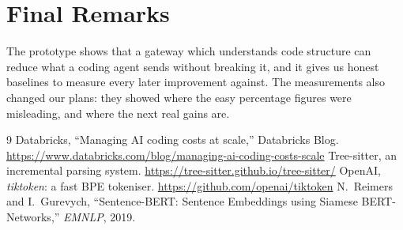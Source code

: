 \documentclass[12pt, a4paper, oneside]{report}
\begin{document}
\section{Final Remarks}

The prototype shows that a gateway which understands code structure can reduce what
a coding agent sends without breaking it, and it gives us honest baselines to
measure every later improvement against. The measurements also changed our plans:
they showed where the easy percentage figures were misleading, and where the next
real gains are.

\begin{thebibliography}{9}
 Databricks, ``Managing AI coding costs at scale,'' Databricks
    Blog. \url{https://www.databricks.com/blog/managing-ai-coding-costs-scale}
 Tree-sitter, an incremental parsing system.
    \url{https://tree-sitter.github.io/tree-sitter/}
 OpenAI, \emph{tiktoken}: a fast BPE tokeniser.
    \url{https://github.com/openai/tiktoken}
 N.~Reimers and I.~Gurevych, ``Sentence-BERT: Sentence Embeddings
    using Siamese BERT-Networks,'' \emph{EMNLP}, 2019.
\end{thebibliography}
\end{document}
